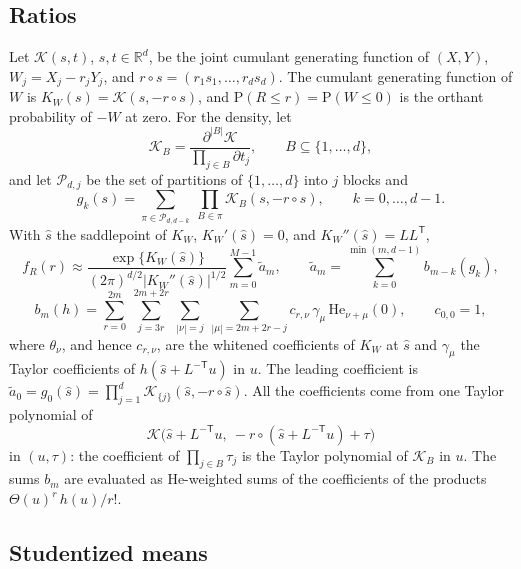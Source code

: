 \documentclass[11pt]{article}
\newcommand{\tp}{^{\mathsf T}}
\newcommand{\He}{\mathrm{He}}
\newcommand{\K}{\mathcal{K}}
\newcommand{\pr}{\mathrm{P}}
\begin{document}
\subsection{Ratios}\label{sec:bgratio}

Let $\K(s,t)$, $s,t\in\mathbb{R}^d$, be the joint cumulant generating function of $(X,Y)$,
$W_j=X_j-r_jY_j$, and $r\circ s=(r_1s_1,\ldots,r_ds_d)$. The cumulant generating function of $W$ is
$K_W(s)=\K(s,-r\circ s)$, and $\pr(R\leq r)=\pr(W\leq0)$ is the orthant probability of $-W$ at
zero. For the density, let
\[
\K_B=\frac{\partial^{|B|}\K}{\prod_{j\in B}\partial t_j},\qquad B\subseteq\{1,\ldots,d\},
\]
and let $\mathcal P_{d,j}$ be the set of partitions of $\{1,\ldots,d\}$ into $j$ blocks and
\[
g_k(s)=\sum_{\pi\in\mathcal P_{d,d-k}}\ \prod_{B\in\pi}\K_B(s,-r\circ s),\qquad k=0,\ldots,d-1.
\]
With $\hat s$ the saddlepoint of $K_W$,
$K_W'(\hat s)=0$, and $K_W''(\hat s)=LL\tp$,
\[
f_R(r)\approx\frac{\exp\{K_W(\hat s)\}}{(2\pi)^{d/2}|K_W''(\hat s)|^{1/2}}\sum_{m=0}^{M-1}\tilde a_m,\qquad
\tilde a_m=\sum_{k=0}^{\min(m,d-1)}b_{m-k}(g_k),
\]
\[
b_m(h)=\sum_{r=0}^{2m}\ \sum_{j=3r}^{2m+2r}\ \sum_{|\nu|=j}\ \sum_{|\mu|=2m+2r-j}c_{r,\nu}\,\gamma_\mu\,\He_{\nu+\mu}(0),\qquad c_{0,0}=1,
\]
where $\theta_\nu$, and hence $c_{r,\nu}$, are the whitened coefficients of $K_W$ at $\hat s$ and
$\gamma_\mu$ the Taylor coefficients of $h(\hat s+L^{-\mathsf T}u)$ in $u$. The leading coefficient
is $\tilde a_0=g_0(\hat s)=\prod_{j=1}^{d}\K_{\{j\}}(\hat s,-r\circ\hat s)$. All the coefficients come
from one Taylor polynomial of
\[
\K\bigl(\hat s+L^{-\mathsf T}u,\ -r\circ(\hat s+L^{-\mathsf T}u)+\tau\bigr)
\]
in $(u,\tau)$: the coefficient of $\prod_{j\in B}\tau_j$ is the Taylor polynomial of $\K_B$ in $u$.
The sums $b_m$ are evaluated as $\He$-weighted sums of the coefficients of the products
$\Theta(u)^r\,h(u)/r!$.

\subsection{Studentized means}\label{sec:bgstud}
\end{document}
